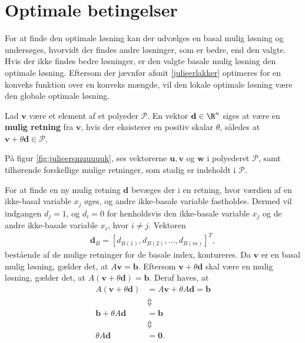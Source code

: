 \section{Optimale betingelser}
\label{julieerfantalastiskogvidunderlig}
%
For at finde den optimale løsning kan der udvælges en basal mulig løsning og undersøges, hvorvidt der findes andre løsninger, som er bedre, end den valgte. 
Hvis der ikke findes bedre løsninger, er den valgte basale mulig løsning den optimale løsning. 
Eftersom der jævnfør afsnit \ref{julieerlakker} optimeres for en konveks funktion over en konveks mængde, %
vil den lokale optimale løsning være den globale optimale løsning. 
%
%
\begin{defn}{}{}
Lad $\textbf{v}$ være et element af et polyeder $\mathcal{P}$.
En vektor $\textbf{d}\in \R^n$ siges at være en \textbf{mulig retning} fra $\textbf{v}$, hvis der eksisterer en positiv skalar $\theta$, således at $\textbf{v}+\theta \textbf{d}\in \mathcal{P}$.
\end{defn}
\noindent
%
På figur \ref{fig:julieersmuuuuuk}, ses vektorerne $\mathbf{u}, \mathbf{v}$ og $\mathbf{w}$ i polyederet $\mathcal{P}$, samt tilhørende forskellige mulige retninger, som stadig er indeholdt i $\mathcal{P}$.
%

%
%
For at finde en ny mulig retning $\mathbf{d}$ bevæges der i en retning, hvor værdien af en ikke-basal variable $x_j$ øges, og andre ikke-basale variable fastholdes. 
Dermed vil indgangen $d_j = 1$, og $d_i = 0$ for henholdsvis den ikke-basale variable $x_j$ og de andre ikke-basale variable $x_i$, hvor $i \neq j$.
Vektoren 
\begin{align*}
\mathbf{d}_B = \left[ d_{B(1)}, d_{B(2)}, \ldots , d_{B(m)} \right]^T,
\end{align*} 
bestående af de mulige retninger for de basale index, 
kontureres.
Da $\mathbf{v}$ er en basal mulig løsning, gælder det, at $A \mathbf{v} = \mathbf{b}$. 
Eftersom $\mathbf{v}+ \theta \mathbf{d}$ skal være en mulig løsning, gælder det, at $A ( \mathbf{v}+ \theta \mathbf{d}) = \mathbf{b}$.
Deraf haves, at 
\begin{align*}
A ( \mathbf{v}+ \theta \mathbf{d}) &=  A \mathbf{v} + \theta A \mathbf{d} = \mathbf{b} \\
& \Updownarrow \\
\mathbf{b} + \theta A \mathbf{d} & = \mathbf{b} \\
& \Updownarrow \\
\theta A \mathbf{d} & = \mathbf{0}.
\end{align*} 
